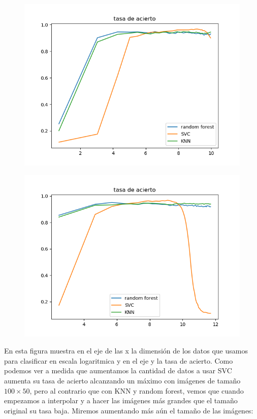 \documentclass[8pt,a4paper]{article}
\begin{document}
\begin{figure}[h]
\centering
\begin{minipage}{.5\textwidth}
  \centering
  \includegraphics[width=0.8\linewidth]{./CompararAciertos.png}
  \label{fig:test1}
\end{minipage}%
\begin{minipage}{.5\textwidth}
  \centering
  \includegraphics[width=0.8\linewidth]{./AciertosFinal.png}
  \label{fig:test2}
\end{minipage}
\end{figure}

\newpage
En esta figura muestra en el eje de las x la dimensión de los datos que usamos para clasificar en escala logaritmica y en el eje y la tasa de acierto.
Como podemos ver a medida que aumentamos la cantidad de datos a usar SVC aumenta su tasa de acierto alcanzando un máximo con imágenes de tamaño $100\times50$, pero al contrario que con KNN y random forest, vemos que cuando empezamos a interpolar y a hacer las imágenes más grandes que el tamaño original su tasa baja.
Miremos aumentando más aún el tamaño de las imágenes:
\end{document}
